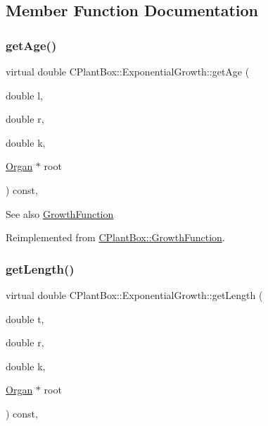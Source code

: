 \subsection{Member Function Documentation}
\mbox{\label{classCPlantBox_1_1ExponentialGrowth_af3fd28ae8c778bc823fc0e51756e8b63}} 
\subsubsection{\texorpdfstring{get\+Age()}{getAge()}}
{\footnotesize\ttfamily virtual double C\+Plant\+Box\+::\+Exponential\+Growth\+::get\+Age (\begin{DoxyParamCaption}\item[{double}]{l,  }\item[{double}]{r,  }\item[{double}]{k,  }\item[{\hyperlink{classCPlantBox_1_1Organ}{Organ} $\ast$}]{root }\end{DoxyParamCaption}) const\hspace{0.3cm}{\ttfamily [inline]}, {\ttfamily [virtual]}}

\begin{DoxySeeAlso}{See also}
\hyperlink{classCPlantBox_1_1GrowthFunction}{Growth\+Function} 
\end{DoxySeeAlso}


Reimplemented from \hyperlink{classCPlantBox_1_1GrowthFunction_a006b428760c410389afa54853fe7cc1f}{C\+Plant\+Box\+::\+Growth\+Function}.

\mbox{\label{classCPlantBox_1_1ExponentialGrowth_ae5b0f12177b71c66d199fa515698aefa}} 
\subsubsection{\texorpdfstring{get\+Length()}{getLength()}}
{\footnotesize\ttfamily virtual double C\+Plant\+Box\+::\+Exponential\+Growth\+::get\+Length (\begin{DoxyParamCaption}\item[{double}]{t,  }\item[{double}]{r,  }\item[{double}]{k,  }\item[{\hyperlink{classCPlantBox_1_1Organ}{Organ} $\ast$}]{root }\end{DoxyParamCaption}) const\hspace{0.3cm}{\ttfamily [inline]}, {\ttfamily [virtual]}}


